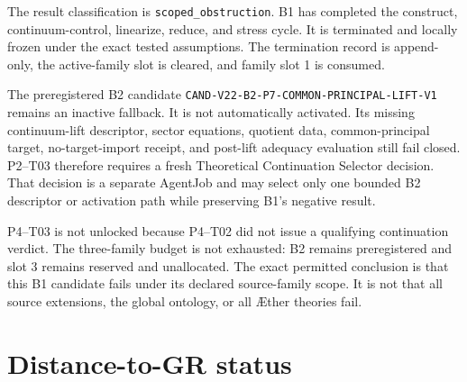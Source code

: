\documentclass[11pt]{article}
\begin{document}
The result classification is \texttt{scoped\_obstruction}.  B1 has completed
the construct, continuum-control, linearize, reduce, and stress cycle.  It is
terminated and locally frozen under the exact tested assumptions.  The
termination record is append-only, the active-family slot is cleared, and
family slot 1 is consumed.

The preregistered B2 candidate
\texttt{CAND-V22-B2-P7-COMMON-PRINCIPAL-LIFT-V1} remains an inactive fallback.
It is not automatically activated.  Its missing continuum-lift descriptor,
sector equations, quotient data, common-principal target, no-target-import
receipt, and post-lift adequacy evaluation still fail closed.  P2--T03
therefore requires a fresh Theoretical Continuation Selector decision.  That
decision is a separate AgentJob and may select only one bounded B2 descriptor
or activation path while preserving B1's negative result.

P4--T03 is not unlocked because P4--T02 did not issue a qualifying continuation
verdict.  The three-family budget is not exhausted: B2 remains preregistered
and slot 3 remains reserved and unallocated.  The exact permitted conclusion
is that this B1 candidate fails under its declared source-family scope.  It is
not that all source extensions, the global ontology, or all \AE ther theories
fail.

\section{Distance-to-GR status}
\end{document}
